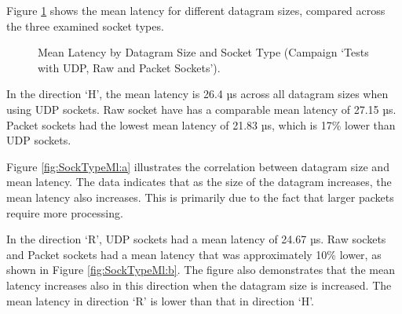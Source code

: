 Figure \ref{fig:SockTypeMl} shows the mean latency for different datagram sizes, compared across the three examined socket types.

\begin{figure}[h!]
  \centering
  \caption{Mean Latency by Datagram Size and Socket Type (Campaign `Tests with UDP, Raw and Packet Sockets').}
  \label{fig:SockTypeMl}
\end{figure}

In the direction `H', the mean latency is 26.4 µs across all datagram sizes when using UDP sockets. Raw socket have has a comparable mean latency of 27.15 µs. Packet sockets had the lowest mean latency of 21.83 µs, which is 17\% lower than UDP sockets.

Figure \ref{fig:SockTypeMl:a} illustrates the correlation between datagram size and mean latency. The data indicates that as the size of the datagram increases, the mean latency also increases. This is primarily due to the fact that larger packets require more processing.

In the direction `R', UDP sockets had a mean latency of 24.67 µs. Raw sockets and Packet sockets had a mean latency that was approximately 10\% lower, as shown in Figure \ref{fig:SockTypeMl:b}. The figure also demonstrates that the mean latency increases also in this direction when the datagram size is increased. The mean latency in direction `R' is lower than that in direction `H'.

